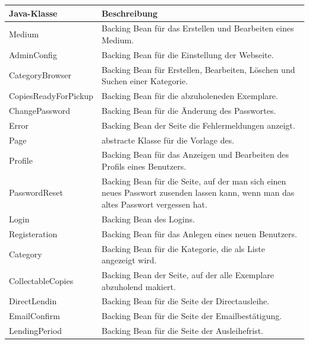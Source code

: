 \documentclass{article}
\begin{document}
 \begin{center}
    \begin{table}
        \begin{tabular} { |p{}|p{}| }
            \hline
            Java-Klasse & Beschreibung  \\
            \hline\hline
            Medium & Backing Bean für das Erstellen und Bearbeiten eines Medium.\\
            \hline
            AdminConfig & Backing Bean für die Einstellung der Webseite.\\
            \hline
            CategoryBrowser & Backing Bean für Erstellen, Bearbeiten, Löschen und Suchen einer Kategorie.\\
            \hline
            CopiesReadyForPickup & Backing Bean für die abzuholeneden Exemplare.\\
            \hline
            ChangePassword & Backing Bean für die Änderung des Passwortes.\\
            \hline
            Error & Backing Bean der Seite die Fehlermeldungen anzeigt.\\
            \hline
            Page & abstracte Klasse für die Vorlage des.\\
            \hline
            Profile & Backing Bean für das Anzeigen und Bearbeiten des Profils eines Benutzers. \\
            \hline
            PasswordReset & Backing Bean für die Seite, auf der man sich einen neues Passwort zusenden lassen kann, wenn man das altes Passwort vergessen hat.\\
             \hline
            Login & Backing Bean des Logins.\\
             \hline
            Registeration & Backing Bean für das Anlegen eines neuen Benutzers.\\
            \hline
            Category & Backing Bean für die Kategorie, die als Liste angezeigt wird.\\
            \hline
            CollectableCopies & Backing Bean der Seite, auf der alle Exemplare abzuholend makiert. \\
            \hline
            DirectLendin & Backing Bean für die Seite der Directausleihe.\\
             \hline
            EmailConfirm & Backing Bean für die Seite der Emailbestätigung.\\
             \hline
            LendingPeriod & Backing Bean für die Seite der Ausleihefrist.\\

\end{tabular}
\end{table}
\end{center}
\end{document}
